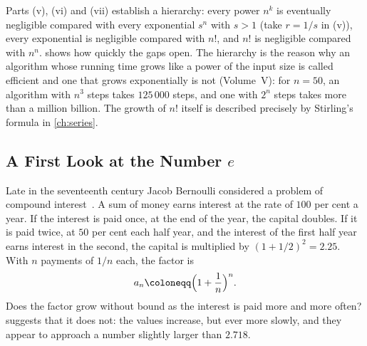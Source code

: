 Parts (v), (vi) and (vii) establish a hierarchy: every power $n^k$ is eventually negligible compared with every exponential $s^n$ with $s>1$ (take $r=1/s$ in (v)), every exponential is negligible compared with $n!$, and $n!$ is negligible compared with $n^n$.  shows how quickly the gaps open. The hierarchy is the reason why an algorithm whose running time grows like a power of the input size is called efficient and one that grows exponentially is not (Volume~V): for $n=50$, an algorithm with $n^3$ steps takes $125\,000$ steps, and one with $2^n$ steps takes more than a million billion. The growth of $n!$ itself is described precisely by Stirling's formula in \cref{ch:series}.

\begin{table}
\end{table}

\subsection{A First Look at the Number \texorpdfstring{$e$}{e}}

Late in the seventeenth century Jacob Bernoulli considered a problem of compound interest~\cite{maor1994}. A sum of money earns interest at the rate of $100$ per cent a year. If the interest is paid once, at the end of the year, the capital doubles. If it is paid twice, at $50$ per cent each half year, and the interest of the first half year earns interest in the second, the capital is multiplied by $(1+1/2)^2=2.25$. With $n$ payments of $1/n$ each, the factor is
\[
a_n\coloneqq\Bigl(1+\frac1n\Bigr)^n .
\]
Does the factor grow without bound as the interest is paid more and more often?  suggests that it does not: the values increase, but ever more slowly, and they appear to approach a number slightly larger than $2.718$.

